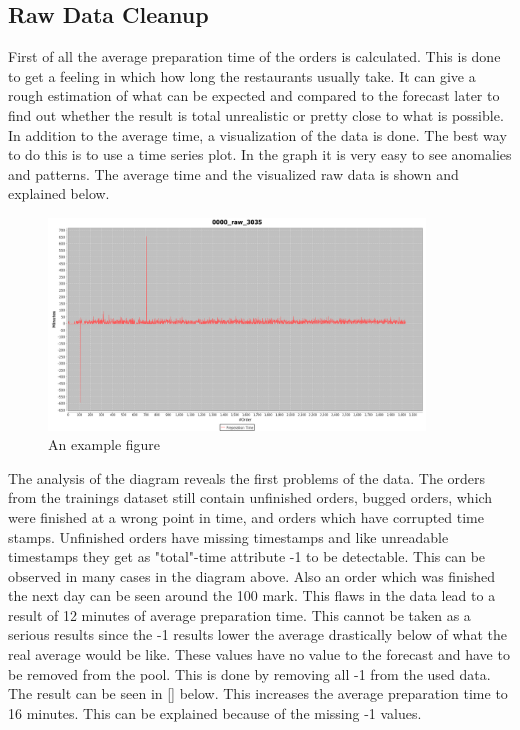 \subsection{Raw Data Cleanup}\label{subsection:Raw Data Cleanup}
First of all the average preparation time of the orders is calculated. This is done to get a feeling in which how long the restaurants usually take. It can give a rough estimation of what can be expected and compared to the forecast later to find out whether the result is total unrealistic or pretty close to what is possible. In addition to the average time, a visualization of the data is done. The best way to do this is to use a time series plot. In the graph it is very easy to see anomalies and patterns.\newline
The average time and the visualized raw data is shown and explained below.

\begin{figure}[h]
\begin{center}
\includegraphics[width=10cm]{images/0000_raw_3035.png}
\caption{An example figure}
\label{fig:example}
\end{center}
\end{figure}

The analysis of the diagram reveals the first problems of the data. The orders from the trainings dataset still contain unfinished orders, bugged orders, which were finished at a wrong point in time, and orders which have corrupted time stamps. Unfinished orders have missing timestamps and like unreadable timestamps they get as "total"-time attribute -1 to be detectable. This can be observed in many cases in the diagram above. Also an order which was finished the next day can be seen around the 100 mark. This flaws in the data lead to a result of 12 minutes of average preparation time. This cannot be taken as a serious results since the -1 results lower the average drastically below of what the real average would be like. These values have no value to the forecast and have to be removed from the pool. This is done by removing all -1 from the used data. The result can be seen in [] below. This increases the average preparation time to 16 minutes. This can be explained because of the missing -1 values.

